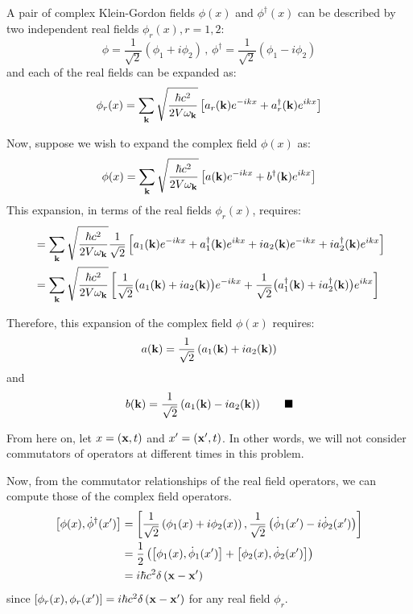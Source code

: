 \documentclass[letterpaper,12pt]{article}
\newenvironment{problem}{\subsection{}\begin{adjustwidth}{0.25in}{}\vspace{-\baselineskip}}{\end{adjustwidth}}
\newcommand{\done}{\tag*{$\blacksquare$}}
\begin{document}
\begin{problem}
A pair of complex Klein-Gordon fields $\phi(x)$ and $\phi^\dagger(x)$ can be described by two independent real fields $\phi_r(x), r=1,2$:
\begin{equation*}
	\phi = \frac{1}{\sqrt{2}}\left(\phi_1 + i\phi_2\right) \,, \,
	\phi^\dagger = \frac{1}{\sqrt{2}}\left(\phi_1 - i\phi_2\right)
\end{equation*}
and each of the real fields can be expanded as:
\begin{equation*}
	\phi_r(x) = \sum_{\vb{k}} \sqrt{\frac{\hbar c^2}{2V \omega_{\vb{k}}}} \left[a_r(\vb{k})e^{-ikx} + a^\dagger_r(\vb{k})e^{ikx}\right]
\end{equation*}

Now, suppose we wish to expand the complex field $\phi(x)$ as:
\begin{equation*}
	\phi(x) = \sum_{\vb{k}} \sqrt{\frac{\hbar c^2}{2V \omega_{\vb{k}}}} \left[a(\vb{k})e^{-ikx} + b^\dagger(\vb{k})e^{ikx}\right]
\end{equation*}
This expansion, in terms of the real fields $\phi_r(x)$, requires:
\begin{align*}
	&= \sum_{\vb{k}} \sqrt{\frac{\hbar c^2}{2V \omega_{\vb{k}}}} \frac{1}{\sqrt{2}}\left[a_1(\vb{k})e^{-ikx} + a^\dagger_1(\vb{k})e^{ikx} + ia_2(\vb{k})e^{-ikx} + ia^\dagger_2(\vb{k})e^{ikx}\right]	\\
	&= \sum_{\vb{k}} \sqrt{\frac{\hbar c^2}{2V \omega_{\vb{k}}}}
	\left[\frac{1}{\sqrt{2}}\big(a_1(\vb{k}) + ia_2(\vb{k})\big)e^{-ikx} + \frac{1}{\sqrt{2}}\big(a^\dagger_1(\vb{k}) + ia^\dagger_2(\vb{k})\big)e^{ikx}\right]
\end{align*}

Therefore, this expansion of the complex field $\phi(x)$ requires:
\begin{align*}
	a(\vb{k}) = \frac{1}{\sqrt{2}}\left(a_1(\vb{k}) + ia_2(\vb{k})\right)
\end{align*}
and
\begin{align*}
	b(\vb{k}) = \frac{1}{\sqrt{2}}\left(a_1(\vb{k}) - ia_2(\vb{k})\right)		\done
\end{align*}

From here on, let $x=(\vb{x},t)$ and $x'=(\vb{x}',t)$. In other words, we will not consider commutators of operators at different times in this problem.

Now, from the commutator relationships of the real field operators, we can compute those of the complex field operators.
\begin{align*}
	\left[\phi(x), \dot{\phi}^\dagger(x')\right]
	&= \left[\frac{1}{\sqrt{2}}\left(\phi_1(x)+i\phi_2(x)\right), \frac{1}{\sqrt{2}}\left(\dot{\phi}_1(x') - i\dot{\phi}_2(x')\right)\right]	\\
	&= \frac{1}{2}\left(\left[\phi_1(x), \dot{\phi}_1(x')\right] + \left[\phi_2(x), \dot{\phi}_2(x')\right]\right)	\\
	&= i\hbar c^2 \delta\left(\vb{x}-\vb{x}'\right)
\end{align*}
since $\left[\phi_r(x), \phi_r(x')\right] = i \hbar c^2 \delta\left(\vb{x}-\vb{x}'\right)$ for any real field $\phi_r$.


\end{problem}
\end{document}
